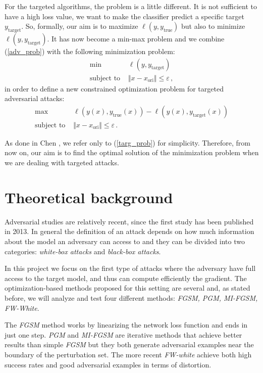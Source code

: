 \documentclass[10pt,twocolumn,letterpaper, english]{article}
\theoremstyle{definition}
\theoremstyle{plain}
\theoremstyle{plain}
\theoremstyle{plain}
\theoremstyle{plain}
\theoremstyle{remark}
\theoremstyle{remark}
\theoremstyle{definition}
\theoremstyle{definition}
\theoremstyle{definition}
\theoremstyle{definition}
\renewcommand{\epsilon}{\varepsilon}
\begin{document}
For the targeted algorithms, the problem is a little different. 
It is not sufficient to have a high loss value, we want to make the classifier predict a specific target $y_{\text{target}}$. 
So, formally, our aim is to maximize $\ell(y, y_{\text{true}})$ but also to minimize $\ell(y, y_{\text{target}})$. 
It has now become a min-max problem and we combine (\ref{adv_prob}) with the following minimization problem:
\begin{align}
    \min \,\, &\ell(y, y_{\text{target}}) \label{targ_prob} \\ 
    \text{subject to } & \Vert x - x_{\text{ori}} \Vert \le \epsilon \nonumber \,,
\end{align}
in order to define a new constrained optimization problem for targeted adversarial attacks: 
\begin{align*}
    \max \,\, & \ell(y(x), y_{\text{true}}(x)) - \ell(y(x), y_{\text{target}}(x)) \\
    \text{subject to } & \Vert x - x_{\text{ori}} \Vert \le \epsilon \,.
\end{align*}

As done in Chen \cite{frank}, we refer only to (\ref{targ_prob}) for simplicity.
Therefore, from now on, our aim is to find the optimal solution of the minimization problem when we are dealing with targeted attacks. 



\section{Theoretical background}
Adversarial studies are relatively recent, since the first study has been published in 2013. In general the definition of an attack depends on how much information about the model an adversary can access to and they can be divided into two categories: \textit{white-box attacks} and \textit{black-box attacks}.

In this project we focus on the first type of attacks where the adversary have full access to the target model, and thus can compute efficiently the gradient. The optimization-based methods proposed for this setting are several and, as stated before, we will analyze and test four different methods: \textit{FGSM, PGM, MI-FGSM, FW-White}.

The \textit{FGSM} method works by linearizing the network loss function and ends in just one step. \textit{PGM} and \textit{MI-FGSM} are iterative methods that achieve better results than simple \textit{FGSM} but they both generate adversarial examples near the boundary of the perturbation set. The more recent \textit{FW-white} achieve both high success rates and good adversarial examples in terms of distortion.
\end{document}
